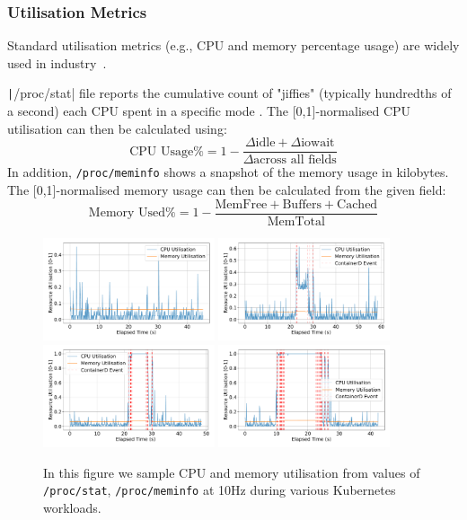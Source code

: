 \subsubsection{Utilisation Metrics}
Standard utilisation metrics (e.g., CPU and memory percentage usage) are widely
used in industry~\cite{hadoop2016apache,sahasrabudhe_improved_2015}.

\texttt|/proc/stat| file reports the cumulative count of "jiffies" (typically
hundredths of a second) each CPU spent in a specific mode \cite{proc_stat5}. The
[0,1]-normalised CPU utilisation can then be calculated using:
\[ \text{CPU Usage\%} = 1 - \frac{\Delta\text{idle} +
\Delta\text{iowait}}{\Delta\text{across all fields}} \]
In addition, \verb|/proc/meminfo| shows a snapshot of the memory usage in
kilobytes. The [0,1]-normalised memory usage can then be calculated from the given
field:
\[ \text{Memory Used\%} = 1 - \frac{\text{MemFree} +
\text{Buffers} + \text{Cached}}{\text{MemTotal}}\]

\begin{figure}[H]
    \centering
    \includegraphics[width=0.45\textwidth]{images/utilisation-baseline.pdf}
    \includegraphics[width=0.45\textwidth]{images/utilisation-single.pdf} \\
    \includegraphics[width=0.45\textwidth]{images/utilisation-smallbatch.pdf}
    \includegraphics[width=0.45\textwidth]{images/utilisation-bigbatch.pdf}
    \caption{In this figure we sample CPU and memory utilisation from
    values of \texttt{/proc/stat}, \texttt{/proc/meminfo} at 10Hz during various
    Kubernetes workloads.}
    \label{fig:utilisation-eval}
\end{figure}


